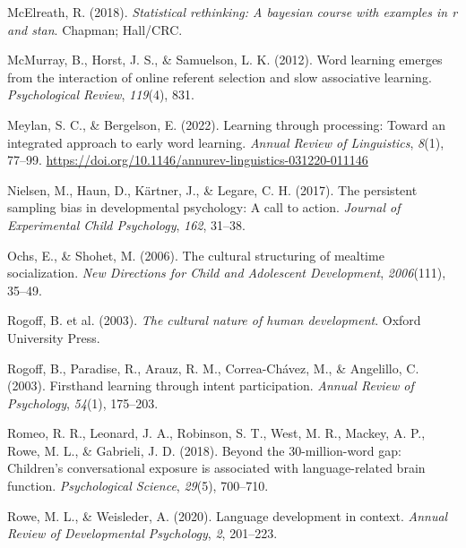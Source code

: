 \documentclass[
  man,floatsintext]{apa6}
\newlength{\cslhangindent}
\newlength{\cslentryspacingunit} %
\newenvironment{CSLReferences}[2] %
 {%
  \setlength{\parindent}{0pt}
  \ifodd #1
  \let\oldpar\par
  \def\par{\hangindent=\cslhangindent\oldpar}
  \fi
  \setlength{\parskip}{#2\cslentryspacingunit}
 }%
 {}
\begin{document}
\begin{CSLReferences}{1}{0}
\leavevmode{}%
McElreath, R. (2018). \emph{Statistical rethinking: A bayesian course with examples in r and stan}. Chapman; Hall/CRC.

\leavevmode{}%
McMurray, B., Horst, J. S., \& Samuelson, L. K. (2012). Word learning emerges from the interaction of online referent selection and slow associative learning. \emph{Psychological Review}, \emph{119}(4), 831.

\leavevmode{}%
Meylan, S. C., \& Bergelson, E. (2022). Learning through processing: Toward an integrated approach to early word learning. \emph{Annual Review of Linguistics}, \emph{8}(1), 77--99. \url{https://doi.org/10.1146/annurev-linguistics-031220-011146}

\leavevmode{}%
Nielsen, M., Haun, D., Kärtner, J., \& Legare, C. H. (2017). The persistent sampling bias in developmental psychology: A call to action. \emph{Journal of Experimental Child Psychology}, \emph{162}, 31--38.

\leavevmode{}%
Ochs, E., \& Shohet, M. (2006). The cultural structuring of mealtime socialization. \emph{New Directions for Child and Adolescent Development}, \emph{2006}(111), 35--49.

\leavevmode{}%
Rogoff, B. et al. (2003). \emph{The cultural nature of human development}. Oxford University Press.

\leavevmode{}%
Rogoff, B., Paradise, R., Arauz, R. M., Correa-Chávez, M., \& Angelillo, C. (2003). Firsthand learning through intent participation. \emph{Annual Review of Psychology}, \emph{54}(1), 175--203.

\leavevmode{}%
Romeo, R. R., Leonard, J. A., Robinson, S. T., West, M. R., Mackey, A. P., Rowe, M. L., \& Gabrieli, J. D. (2018). Beyond the 30-million-word gap: Children's conversational exposure is associated with language-related brain function. \emph{Psychological Science}, \emph{29}(5), 700--710.

\leavevmode{}%
Rowe, M. L., \& Weisleder, A. (2020). Language development in context. \emph{Annual Review of Developmental Psychology}, \emph{2}, 201--223.


\end{CSLReferences}
\end{document}

